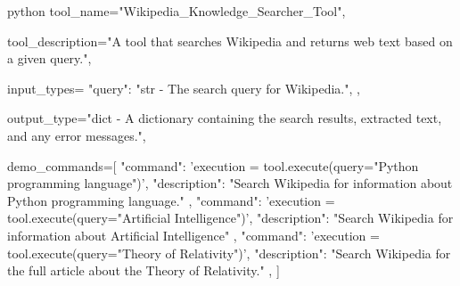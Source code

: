 \begin{codecolorbox}{python}
tool_name="Wikipedia_Knowledge_Searcher_Tool",

tool_description="A tool that searches Wikipedia and returns web text based on a given query.",

input_types={
    "query": "str - The search query for Wikipedia.",            },

output_type="dict - A dictionary containing the search results, extracted text, and any error messages.",

demo_commands=[
    {
        "command": 'execution = tool.execute(query="Python programming language")',
        "description": "Search Wikipedia for information about Python programming language."
    },
    {
        "command": 'execution = tool.execute(query="Artificial Intelligence")',
        "description": "Search Wikipedia for information about Artificial Intelligence"
    },
    {
        "command": 'execution = tool.execute(query="Theory of Relativity")',
        "description": "Search Wikipedia for the full article about the Theory of Relativity."
    },
]
\end{codecolorbox}


